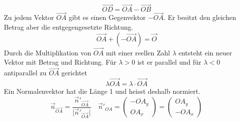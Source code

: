 \begin{equation}
\boxed{\overrightarrow{OD}=\overrightarrow{OA}-\overrightarrow{OB}}
\end{equation}
Zu jedem Vektor $\overrightarrow{OA}$ gibt es einen Gegenvektor $-\overrightarrow{OA}$. Er besitzt den gleichen Betrag aber die entgegengesetzte Richtung.
\begin{equation}
\boxed{\overrightarrow{OA}+\left(-\overrightarrow{OA}\right)=\overrightarrow{O}}
\end{equation}
Durch die Multiplikation von $\overrightarrow{OA}$ mit einer reellen Zahl $\lambda$ entsteht ein neuer Vektor mit Betrag und Richtung. Für $\lambda>0$ ist er parallel und für $\lambda<0$ antiparallel zu $\overrightarrow{OA}$ gerichtet
\begin{equation}
\boxed{\lambda\overrightarrow{OA}=\lambda\cdot \overrightarrow{OA}}
\end{equation}
Ein Normalenvektor hat die Länge 1 und heisst deshalb normiert.
\begin{equation}
\boxed{\overrightarrow{n}_{\overrightarrow{OA}}=\dfrac{\overrightarrow{n}'_{\overrightarrow{OA}}}{\Big\vert \overrightarrow{n}'_{\overrightarrow{OA}}\Big\vert}}\quad \boxed{\overrightarrow{n}'_{OA}=\begin{pmatrix}-OA_y\\OA_x\end{pmatrix}=\begin{pmatrix}OA_y\\-OA_x\end{pmatrix}}
\end{equation}
